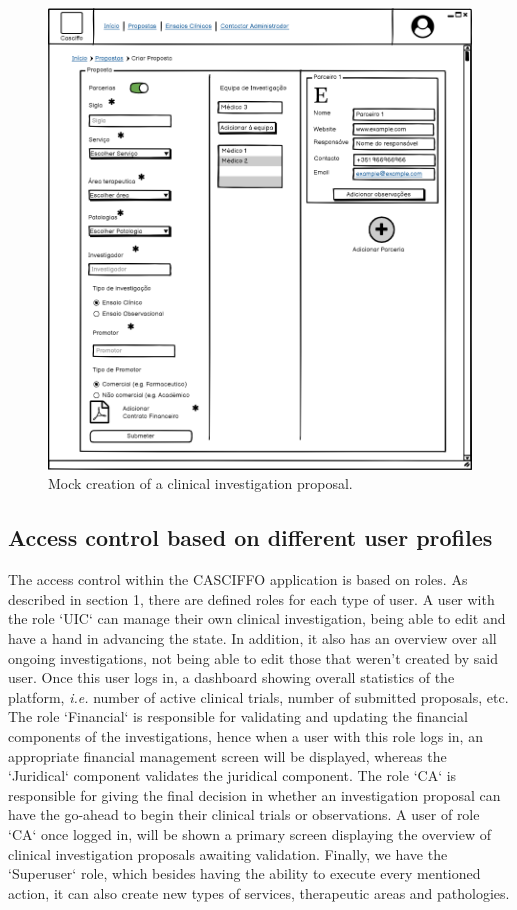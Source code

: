 \begin{figure}[H]
    \centering
    \includegraphics[scale=0.35]{images/criar-proposta.png}
    \caption{Mock creation of a clinical investigation proposal.}
    \label{fig:criar-proposta}
\end{figure}

\subsection{Access control based on different user profiles}
\label{subsec:access-control-based-user-profiles}
The access control within the CASCIFFO application is based on roles.
As described in section 1, there are defined roles for each type of user.  
A user with the role `UIC` can manage their own clinical investigation, being able to edit and have a hand in advancing the state. In addition, it also has an overview over all ongoing investigations, not being able to edit those that weren't created by said user. Once this user logs in, a dashboard showing overall statistics of the platform, \textit{i.e.} number of active clinical trials, number of submitted proposals, etc.
The role `Financial` is responsible for validating and updating the financial components of the investigations, hence when a user with this role logs in, an appropriate financial management screen will be displayed, whereas the `Juridical` component validates the juridical component.  
The role `CA` is responsible for giving the final decision in whether an investigation proposal can have the go-ahead to begin their clinical trials or observations.  
A user of role `CA` once logged in, will be shown a primary screen displaying the overview of clinical investigation proposals awaiting validation.
Finally, we have the `Superuser` role, which besides having the ability to execute every mentioned action, it can also create new types of services, therapeutic areas and pathologies.


